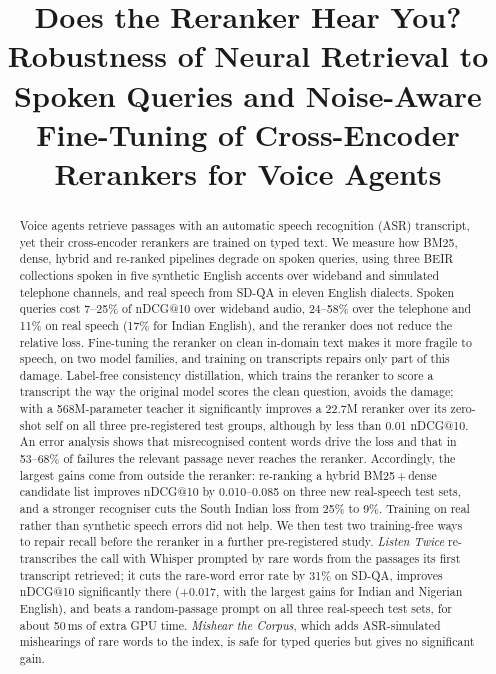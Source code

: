 \documentclass[conference]{IEEEtran}
\begin{document}
\title{Does the Reranker Hear You? Robustness of Neural Retrieval to Spoken Queries and Noise-Aware Fine-Tuning of Cross-Encoder Rerankers for Voice Agents}

\author{
\and
{}
\and
{}
}

\maketitle

\begin{abstract}
Voice agents retrieve passages with an automatic speech recognition (ASR) transcript, yet their cross-encoder rerankers are trained on typed text. We measure how BM25, dense, hybrid and re-ranked pipelines degrade on spoken queries, using three BEIR collections spoken in five synthetic English accents over wideband and simulated telephone channels, and real speech from SD-QA in eleven English dialects. Spoken queries cost 7--25\% of nDCG@10 over wideband audio, 24--58\% over the telephone and 11\% on real speech (17\% for Indian English), and the reranker does not reduce the relative loss. Fine-tuning the reranker on clean in-domain text makes it more fragile to speech, on two model families, and training on transcripts repairs only part of this damage. Label-free consistency distillation, which trains the reranker to score a transcript the way the original model scores the clean question, avoids the damage; with a 568M-parameter teacher it significantly improves a 22.7M reranker over its zero-shot self on all three pre-registered test groups, although by less than 0.01 nDCG@10. An error analysis shows that misrecognised content words drive the loss and that in 53--68\% of failures the relevant passage never reaches the reranker. Accordingly, the largest gains come from outside the reranker: re-ranking a hybrid BM25\,+\,dense candidate list improves nDCG@10 by 0.010--0.085 on three new real-speech test sets, and a stronger recogniser cuts the South Indian loss from 25\% to 9\%. Training on real rather than synthetic speech errors did not help. We then test two training-free ways to repair recall before the reranker in a further pre-registered study. \emph{Listen Twice} re-transcribes the call with Whisper prompted by rare words from the passages its first transcript retrieved; it cuts the rare-word error rate by 31\% on SD-QA, improves nDCG@10 significantly there (+0.017, with the largest gains for Indian and Nigerian English), and beats a random-passage prompt on all three real-speech test sets, for about 50\,ms of extra GPU time. \emph{Mishear the Corpus}, which adds ASR-simulated mishearings of rare words to the index, is safe for typed queries but gives no significant gain.
\end{abstract}
\end{document}
